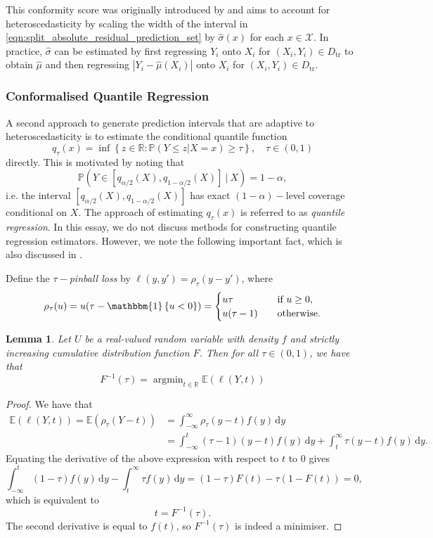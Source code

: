 \documentclass[11pt, titlepage]{article} %
\DeclareMathOperator*{\argmin}{argmin}
\newcommand{\R}{\mathrm}
\newcommand{\Prob}[1]{\mathbb{P}\left( #1 \right)}
\newcommand{\Exp}[3]{\mathbb{E}\left#2 #1 \right#3}
\newcommand{\Ind}[1]{\mathbbm{1}\left\{ #1 \right\}}
\numberwithin{equation}{section}
\newtheorem{lemma}{Lemma}
\theoremstyle{definition}
\numberwithin{theorem}{section}
\numberwithin{lemma}{section}
\numberwithin{corollary}{section}
\numberwithin{proposition}{section}
\numberwithin{definition}{section}
\numberwithin{remark}{section}
\begin{document}
\noindent
This conformity score was originally introduced by \cite{lei2018} and aims to account for heteroscedasticity by scaling the width of the interval in \eqref{eqn:split_absolute_residual_prediction_set} by \(\hat{\sigma}(x)\) for each \(x \in \mathcal{X}\). In practice, \(\hat{\sigma}\) can be estimated by first regressing \(Y_i\) onto \(X_i\) for \((X_i, Y_i) \in D_\R{tr}\) to obtain \(\hat{\mu}\) and then regressing \(|Y_i -\hat{\mu}(X_i)|\) onto \(X_i\) for \((X_i, Y_i) \in D_\R{tr}\).

\subsubsection{Conformalised Quantile Regression}

A second approach to generate prediction intervals that are adaptive to heteroscedasticity is to estimate the conditional quantile function \[
    q_{\tau}(x) = \inf \left\{ z \in \mathbb{R}: \Prob{Y \leq z | X = x} \geq \tau \right\}, \quad \tau \in (0,1)
\] directly. This is motivated by noting that \[\Prob{Y \in [q_{\alpha/2}(X), q_{1-\alpha/2}(X)] \ | \  X} = 1-\alpha,\] i.e. the interval \([q_{\alpha/2}(X), q_{1-\alpha/2}(X)]\) has exact \((1-\alpha)-\)level coverage conditional on \(X\). The approach of estimating \(q_\tau(x)\) is referred to as \textit{quantile regression}. In this essay, we do not discuss methods for constructing quantile regression estimators. However, we note the following important fact, which is also discussed in \cite{koenker2005quantile}. \vskip5pt

\noindent
Define the \(\tau-\)\textit{pinball loss} by \(\ell(y, y') = \rho_\tau(y - y')\), where \[\rho_\tau(u) = u(\tau - \Ind{u < 0} ) = \begin{cases}
    u\tau &\quad \text{if } u \geq 0, \\
    u(\tau - 1) &\quad \text{otherwise.}
\end{cases}\]

\begin{lemma}
    Let \(U\) be a real-valued random variable with density \(f\) and strictly increasing cumulative distribution function \(F\). Then for all \(\tau \in (0,1)\), we have that \[F^{-1}(\tau) = \argmin_{t \in \mathbb{R}} \Exp{\ell(Y,t)}{(}{)}\] 
\end{lemma}
\begin{proof}
    We have that \begin{align*}
        \Exp{\ell(Y,t)}{(}{)} = \Exp{\rho_\tau(Y-t)}{(}{)} &= \int_{-\infty}^\infty \rho_\tau(y-t) f(y) \, \R{d}y \\
        &= \int_{-\infty}^t (\tau-1) (y-t) f(y) \, \R{d}y + \int_t^\infty \tau(y-t) f(y) \, \R{d}y.
    \end{align*}
    Equating the derivative of the above expression with respect to \(t\) to \(0\) gives \[\int_{-\infty}^t (1-\tau) f(y) \, \R{d}y - \int_t^\infty \tau f(y) \, \R{d}y = (1-\tau)F(t) - \tau(1-F(t))  =  0,\] which is equivalent to \[t = F^{-1}(\tau).\] The second derivative is equal to \(f(t)\), so \(F^{-1}(\tau)\) is indeed a minimiser.
\end{proof}
\end{document}
